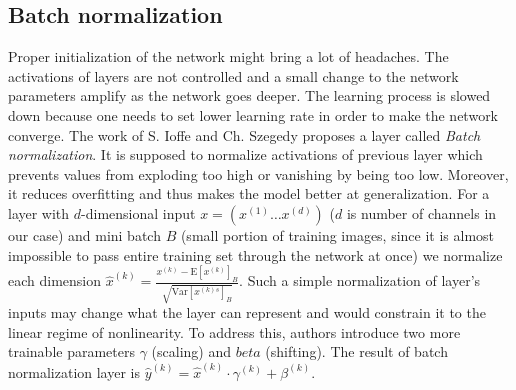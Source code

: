 \subsection{Batch normalization}
\label{sec:cnn:batchnormalization}

Proper initialization of the network might bring a lot of headaches.
The activations of layers are not controlled and a small change to the network
parameters amplify as the network goes deeper. The learning process is slowed down because
one needs to set lower learning rate in order to make the network converge.
The work of S. Ioffe and Ch. Szegedy \cite{bib:ioffe2015batch} proposes a
layer called \textit{Batch normalization}. It is supposed to normalize activations
of previous layer which prevents values from exploding too high or vanishing by being too low.
Moreover, it reduces overfitting and thus makes the model better at generalization.
For a layer with $d$-dimensional input $x=(x^{(1)}\ldots x^{(d)})$
($d$ is number of channels in our case) and mini batch $B$ (small portion of training images,
since it is almost impossible to
pass entire training set through the network at once) we normalize each dimension
$\hat{x}^{(k)} = \frac{x^{(k)} - \textrm{E}[x^{(k)}]_B}{\sqrt{\textrm{Var}[x^{(k)s}]_B}}$.
Such a simple normalization of layer's inputs may change what the layer can represent and
would constrain it to the linear regime of nonlinearity. To address this, authors introduce
two more trainable parameters $\gamma$ (scaling) and $beta$ (shifting).
The result of batch normalization layer is 
$\hat{y}^{(k)} = \hat{x}^{(k)}\cdot \gamma^{(k)} + \beta^{(k)}$.

